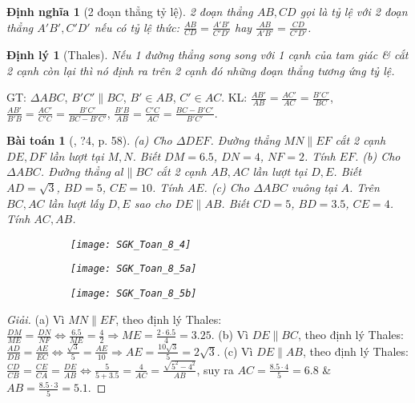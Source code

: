 \documentclass{article}
\newtheorem{baitoan}{Bài toán}
\newtheorem{dinhly}{Định lý}
\newtheorem{dinhnghia}{Định nghĩa}
\begin{document}
\begin{dinhnghia}[2 đoạn thẳng tỷ lệ]
	2 đoạn thẳng $AB,CD$ gọi là \emph{tỷ lệ} với 2 đoạn thẳng $A'B',C'D'$ nếu có tỷ lệ thức: $\frac{AB}{CD} = \frac{A'B'}{C'D'}$ hay $\frac{AB}{A'B'} = \frac{CD}{C'D'}$.
\end{dinhnghia}

\begin{dinhly}[Thales]
	\label{thm: Thales}
	Nếu 1 đường thẳng song song với 1 cạnh của  tam giác \& cắt 2 cạnh còn lại thì nó định ra trên 2 cạnh đó những đoạn thẳng tương ứng tỷ lệ.
\end{dinhly}
GT: $\Delta ABC$, $B'C'\parallel BC$, $B'\in AB$, $C'\in AC$. KL: $\frac{AB'}{AB} = \frac{AC'}{AC} = \frac{B'C'}{BC}$, $\frac{AB'}{B'B} = \frac{AC'}{C'C} = \frac{B'C'}{BC - B'C'}$, $\frac{B'B}{AB} = \frac{C'C}{AC} = \frac{BC - B'C'}{B'C'}$.

\begin{baitoan}[\cite{SGK_Toan_8_tap_2}, ?4, p. 58]
	(a) Cho $\Delta DEF$. Đường thẳng $MN\parallel EF$ cắt 2 cạnh $DE,DF$ lần lượt tại $M,N$. Biết $DM = 6.5$, $DN = 4$, $NF = 2$. Tính $EF$. (b) Cho $\Delta ABC$. Đường thẳng $al\parallel BC$ cắt 2 cạnh $AB,AC$ lần lượt tại $D,E$. Biết $AD = \sqrt{3}$, $BD = 5$, $CE = 10$. Tính $AE$. (c) Cho $\Delta ABC$ vuông tại $A$. Trên $BC,AC$ lần lượt lấy $D,E$ sao cho $DE\parallel AB$. Biết $CD = 5$, $BD = 3.5$, $CE = 4$. Tính $AC,AB$.
	\begin{figure}[H]
		\centering
		\begin{subfigure}{.3\textwidth}
			\centering
			\texttt{[image: SGK\_Toan\_8\_4]}
		\end{subfigure}%
		\begin{subfigure}{.3\textwidth}
			\centering
			\texttt{[image: SGK\_Toan\_8\_5a]}
		\end{subfigure}%
		\begin{subfigure}{.3\textwidth}
			\centering
			\texttt{[image: SGK\_Toan\_8\_5b]}
		\end{subfigure}
	\end{figure}
\end{baitoan}

\begin{proof}[Giải]
	(a) Vì $MN\parallel EF$, theo định lý Thales: $\frac{DM}{ME} = \frac{DN}{NF}\Leftrightarrow\frac{6.5}{ME} = \frac{4}{2}\Rightarrow ME = \frac{2\cdot6.5}{4} = 3.25$. (b) Vì $DE\parallel BC$, theo định lý Thales: $\frac{AD}{DB} = \frac{AE}{EC}\Leftrightarrow\frac{\sqrt{3}}{5} = \frac{AE}{10}\Rightarrow AE = \frac{10\sqrt{3}}{5} = 2\sqrt{3}$. (c) Vì $DE\parallel AB$, theo định lý Thales: $\frac{CD}{CB} = \frac{CE}{CA} = \frac{DE}{AB}\Leftrightarrow\frac{5}{5 + 3.5} = \frac{4}{AC} = \frac{\sqrt{5^2 - 4^2}}{AB}$, suy ra $AC = \frac{8.5\cdot4}{5} = 6.8$ \& $AB = \frac{8.5\cdot3}{5} = 5.1$.
\end{proof}
\end{document}
